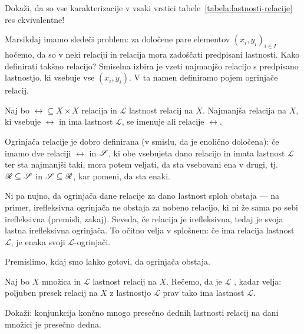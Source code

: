                 \begin{vaja}
                        Dokaži, da so vse karakterizacije v vsaki vrstici tabele~\ref{tabela:lastnosti-relacije} res ekvivalentne!
                \end{vaja}

                Marsikdaj imamo sledeči problem: za določene pare elementov $(x_i, y_i)_{i \in I}$ hočemo, da so v neki relaciji in relacija mora zadoščati predpisani lastnosti. Kako definirati takšno relacijo? Smiselna izbira je vzeti najmanjšo relacijo s predpisano lastnostjo, ki vsebuje vse $(x_i, y_i)$. V ta namen definiramo pojem ogrinjače relacij.

                \begin{definicija}
                        Naj bo $\rel \subseteq X \times X$ relacija in $\mathscr{L}$ lastnost relacij na $X$. Najmanjša relacija na $X$, ki vsebuje $\rel$ in ima lastnost $\mathscr{L}$, se imenuje  ali  relacije $\rel$.
                \end{definicija}

                Ogrinjača relacije je dobro definirana (v smislu, da je enolično določena): če imamo dve relaciji $\rel$ in $\srel$, ki obe vsebujeta dano relacijo in imata lastnost $\mathscr{L}$ ter sta najmanjši taki, mora potem veljati, da sta vsebovani ena v drugi, tj.~$\rel \subseteq \srel$ in $\srel \subseteq \rel$, kar pomeni, da sta enaki.

                Ni pa nujno, da ogrinjača dane relacije za dano lastnost sploh obstaja --- na primer, irefleksivna ogrinjača ne obstaja za nobeno relacijo, ki ni že sama po sebi irefleksivna (premisli, zakaj). Seveda, če relacija je irefleksivna, tedaj je svoja lastna irefleksivna ogrinjača. To očitno velja v splošnem: če ima relacija lastnost $\mathscr{L}$, je enaka svoji $\mathscr{L}$-ogrinjači.

                Premislimo, kdaj smo lahko gotovi, da ogrinjača obstaja.

                \begin{definicija}
                        Naj bo $X$ množica in $\mathscr{L}$ lastnost relacij na $X$. Rečemo, da je $\mathscr{L}$ , kadar velja: poljuben presek relacij na $X$ z lastnostjo $\mathscr{L}$ prav tako ima lastnost $\mathscr{L}$.
                \end{definicija}

                \begin{vaja}\label{vaja:presecna-dednost-zaprta-za-konjunkcije}
                        Dokaži: konjunkcija končno mnogo presečno dednih lastnosti relacij na dani množici je presečno dedna.
                \end{vaja}

